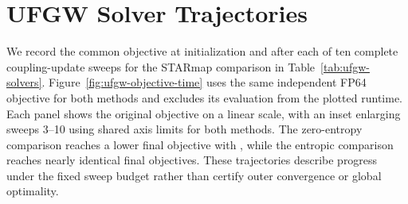 %

\section{UFGW Solver Trajectories}
\label{app:ufgw-solver-trajectories}

We record the common objective at initialization and after each of ten complete coupling-update sweeps for the STARmap comparison in Table~\ref{tab:ufgw-solvers}.
Figure~\ref{fig:ufgw-objective-time} uses the same independent FP64 objective for both methods and excludes its evaluation from the plotted runtime.
Each panel shows the original objective on a linear scale, with an inset enlarging sweeps 3--10 using shared axis limits for both methods.
The zero-entropy comparison reaches a lower final objective with \oursufgw, while the entropic comparison reaches nearly identical final objectives.
These trajectories describe progress under the fixed sweep budget rather than certify outer convergence or global optimality.

